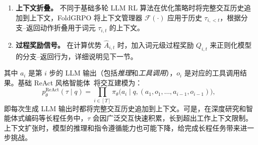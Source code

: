 \begin{enumerate}[label=(\roman*),leftmargin=20pt]
\item \textbf{上下文折叠。}
不同于基础多轮 LLM RL 算法在优化策略时将完整交互历史追加到上下文，FoldGRPO 将上下文管理器 $\mathcal{F}(\cdot)$ 应用于历史 $\tau_{i,<t}$，根据分支--返回动作折叠用于词元 $\tau_{i,t}$ 的上下文。

\item \textbf{过程奖励信号。}
在计算优势 $\widehat{A}_{i,t}$ 时，加入词元级过程奖励 $Q_{i,t}$ 来正则化模型的分支--返回行为，详细说明见下一节。
\end{enumerate}
其中 $a_i$ 是第 $i$ 步的 LLM 输出（包括\textit{推理}和\textit{工具调用}），$o_i$ 是对应的工具调用结果。基础 ReAct 风格智能体~\citep{Yao2022ReAct}将交互建模为：
\begin{equation}
   p^{\mathrm{ReAct}}_{\theta}(\tau \mid q) = \prod_{i\in[T]} \pi_{\theta}\big(a_i \mid q, (a_1,o_1,\ldots, a_{i-1}, o_{i-1})\big),
\end{equation}
即每次生成 LLM 输出时都将完整交互历史追加到上下文。可是，在深度研究和智能体式编码等长程任务中，$\tau$ 会因广泛交互快速积累，长到超出工作上下文限制。上下文扩张时，模型的推理和指令遵循能力也可能下降，给完成长程任务带来进一步挑战。

